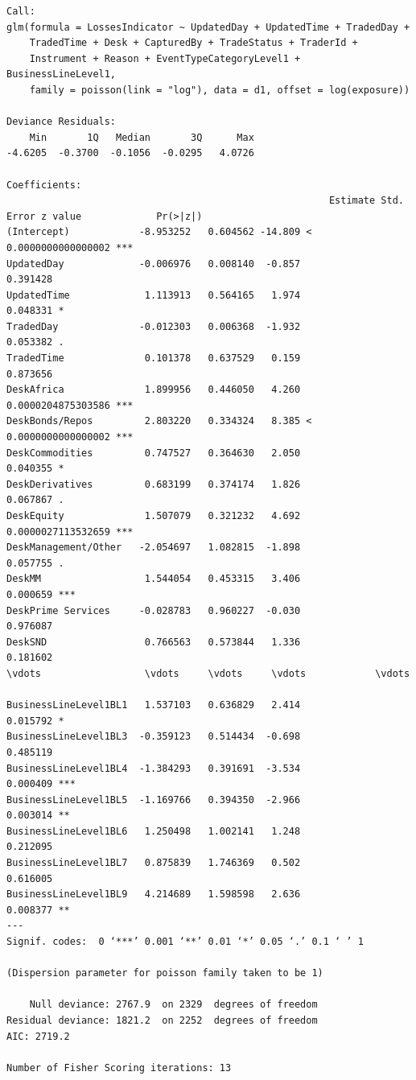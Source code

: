 \documentclass[]{article}
\begin{document}
\begin{verbatim}
Call:
glm(formula = LossesIndicator ~ UpdatedDay + UpdatedTime + TradedDay + 
    TradedTime + Desk + CapturedBy + TradeStatus + TraderId + 
    Instrument + Reason + EventTypeCategoryLevel1 + BusinessLineLevel1, 
    family = poisson(link = "log"), data = d1, offset = log(exposure))

Deviance Residuals: 
    Min       1Q   Median       3Q      Max  
-4.6205  -0.3700  -0.1056  -0.0295   4.0726  

Coefficients:
                                                        Estimate Std. Error z value             Pr(>|z|)    
(Intercept)            -8.953252   0.604562 -14.809 < 0.0000000000000002 ***
UpdatedDay             -0.006976   0.008140  -0.857             0.391428    
UpdatedTime             1.113913   0.564165   1.974             0.048331 *  
TradedDay              -0.012303   0.006368  -1.932             0.053382 .  
TradedTime              0.101378   0.637529   0.159             0.873656    
DeskAfrica              1.899956   0.446050   4.260   0.0000204875303586 ***
DeskBonds/Repos         2.803220   0.334324   8.385 < 0.0000000000000002 ***
DeskCommodities         0.747527   0.364630   2.050             0.040355 *  
DeskDerivatives         0.683199   0.374174   1.826             0.067867 .  
DeskEquity              1.507079   0.321232   4.692   0.0000027113532659 ***
DeskManagement/Other   -2.054697   1.082815  -1.898             0.057755 .  
DeskMM                  1.544054   0.453315   3.406             0.000659 ***
DeskPrime Services     -0.028783   0.960227  -0.030             0.976087    
DeskSND                 0.766563   0.573844   1.336             0.181602  
\vdots                  \vdots     \vdots     \vdots            \vdots  

BusinessLineLevel1BL1   1.537103   0.636829   2.414             0.015792 *  
BusinessLineLevel1BL3  -0.359123   0.514434  -0.698             0.485119    
BusinessLineLevel1BL4  -1.384293   0.391691  -3.534             0.000409 ***
BusinessLineLevel1BL5  -1.169766   0.394350  -2.966             0.003014 ** 
BusinessLineLevel1BL6   1.250498   1.002141   1.248             0.212095    
BusinessLineLevel1BL7   0.875839   1.746369   0.502             0.616005    
BusinessLineLevel1BL9   4.214689   1.598598   2.636             0.008377 ** 
---
Signif. codes:  0 ‘***’ 0.001 ‘**’ 0.01 ‘*’ 0.05 ‘.’ 0.1 ‘ ’ 1

(Dispersion parameter for poisson family taken to be 1)

    Null deviance: 2767.9  on 2329  degrees of freedom
Residual deviance: 1821.2  on 2252  degrees of freedom
AIC: 2719.2

Number of Fisher Scoring iterations: 13
\end{verbatim}
\end{document}
